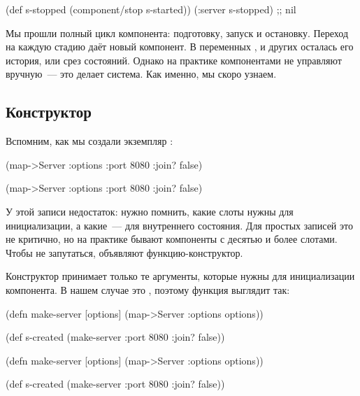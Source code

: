 \else

\begin{clojure}
(def s-stopped (component/stop s-started))
(:server s-stopped) ;; nil
\end{clojure}

\fi

Мы прошли полный цикл компонента: подготовку, запуск и остановку. Переход на
каждую стадию даёт новый компонент. В переменных ,
 и других осталась его история, или срез состояний. Однако на
практике компонентами не управляют вручную~--- это делает система. Как именно,
мы скоро узнаем.

\subsection{Конструктор}


Вспомним, как мы создали экземпляр :

\ifnarrow

\begin{clojure}
(map->Server
  {:options {:port 8080
             :join? false}})
\end{clojure}

\else

\begin{clojure}
(map->Server {:options {:port 8080 :join? false}})
\end{clojure}

\fi


У этой записи недостаток: нужно помнить, какие слоты нужны для инициализации, а
какие~--- для внутреннего состояния. Для простых записей это не критично, но на
практике бывают компоненты с десятью и более слотами. Чтобы не запутаться,
объявляют функцию-конструктор.

Конструктор принимает только те аргументы, которые нужны для инициализации
компонента. В нашем случае это , поэтому функция выглядит так:

\ifnarrow

\begin{clojure}
(defn make-server
  [options]
  (map->Server {:options options}))

(def s-created
  (make-server {:port 8080
                :join? false}))
\end{clojure}

\else

\begin{clojure}
(defn make-server
  [options]
  (map->Server {:options options}))

(def s-created (make-server {:port 8080 :join? false}))
\end{clojure}

